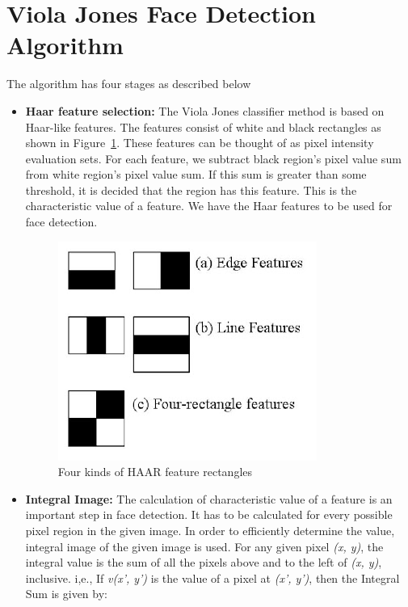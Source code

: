 \section{Viola Jones Face Detection Algorithm}\label{sec:viola}


The algorithm has four stages as described below

\begin{itemize}

\item \textbf{Haar feature selection:}
The Viola Jones classifier method is based on Haar-like features. The features consist of 
white and black rectangles as shown in Figure~\ref{fig:haar}. These features can be thought of as pixel intensity evaluation sets. 
For each feature, we subtract black region’s pixel value sum from white region’s pixel value sum. 
If this sum is greater than some threshold, it is decided that the region has this feature. 
This is the characteristic value of a feature. We have the Haar features to be used for face detection.

\begin{figure}[h]
  \centering
  \includegraphics[width=0.5\linewidth]{figs/haar.jpg}
  \caption{Four kinds of HAAR feature rectangles \textnormal{\small }  }
  \label{fig:haar}
\end{figure}

\item \textbf{Integral Image:}
The calculation of characteristic value of a feature is an important step in 
face detection. It has to be calculated for every possible pixel region in the given image. 
In order to efficiently determine the value, integral image of the given image is used. 
For any given pixel \emph{(x, y)}, the integral value is the sum of all the pixels above and to 
the left of \emph{(x, y)}, inclusive.
i,e., If \emph{v(x’, y’)} is the value of a pixel at \emph{(x’, y’)},  then the
Integral Sum is given by:


\end{itemize}
